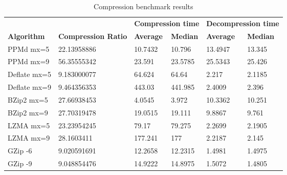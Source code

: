 \begin{table}[H]
\begin{tabular}{ll|l|l|l|l|}
\cline{3-6}
                                         &                            & \multicolumn{2}{l|}{\textbf{Compression time}} & \multicolumn{2}{l|}{\textbf{Decompression time}} \\ \cline{1-2}
\multicolumn{1}{|l|}{\textbf{Algorithm}} & \textbf{Compression Ratio} & \textbf{Average}       & \textbf{Median}       & \textbf{Average}        & \textbf{Median}        \\ \hline
\multicolumn{1}{|l|}{PPMd mx=5}         & 22.13958886                & 10.7432                & 10.796                & 13.4947                 & 13.345                 \\ \hline
\multicolumn{1}{|l|}{PPMd mx=9}         & 56.35555342                & 23.591                 & 23.5785               & 25.5343                 & 25.426                 \\ \hline
\multicolumn{1}{|l|}{Deflate mx=5}      & 9.183000077                & 64.624                 & 64.64                 & 2.217                   & 2.1185                 \\ \hline
\multicolumn{1}{|l|}{Deflate mx=9}      & 9.464356353                & 443.03                 & 441.985               & 2.4009                  & 2.396                  \\ \hline
\multicolumn{1}{|l|}{BZip2 mx=5}        & 27.66938453                & 4.0545                 & 3.972                 & 10.3362                 & 10.251                 \\ \hline
\multicolumn{1}{|l|}{BZip2 mx=9}        & 27.70319478                & 19.0515                & 19.111                & 9.8867                  & 9.761                  \\ \hline
\multicolumn{1}{|l|}{LZMA mx=5}         & 23.23954245                & 79.17                  & 79.275                & 2.2699                  & 2.1905                 \\ \hline
\multicolumn{1}{|l|}{LZMA mx=9}         & 28.1603411                 & 177.241                & 177                   & 2.2187                  & 2.145                  \\ \hline
\multicolumn{1}{|l|}{GZip -6}            & 9.020591691                & 12.2658                & 12.2315               & 1.4981                  & 1.4975                 \\ \hline
\multicolumn{1}{|l|}{GZip -9}            & 9.048854476                & 14.9222                & 14.8975               & 1.5072                  & 1.4805                 \\ \hline
\end{tabular}
\caption{Compression benchmark results}
\end{table}

